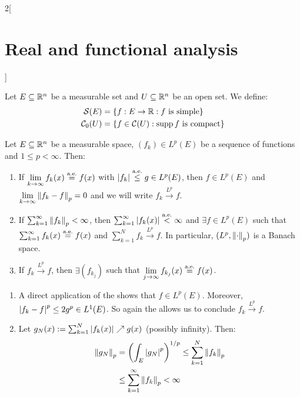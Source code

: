 \documentclass[../../../main_math.tex]{subfiles}
\begin{document}
\begin{multicols}{2}[\section{Real and functional analysis}]
  \begin{definition}
    Let $E\subseteq\mathbb{R}^n$ be a measurable set and $U\subseteq \mathbb{R}^n$ be an open set. We define:
    \begin{align*}
      \mathcal{S}(E)   & =\{f:E\rightarrow\mathbb{R}:f\text{ is simple}\}         \\
      \mathcal{C}_0(U) & =\{f\in\mathcal{C}(U):\operatorname{supp} f\text{ is compact}\}
    \end{align*}
  \end{definition}
  \begin{theorem}
    Let $E\subseteq\mathbb{R}^n$ be a measurable space, $({f}_k)\in L^p(E)$ be a sequence of functions and $1\leq p<\infty$. Then:
    \begin{enumerate}
      \item\label{RFA:thmLpBanachA} If $\displaystyle\lim_{k\to\infty}f_k(x)\overset{\text{a.e.}}{=}{f}(x)$ with $\abs{{f}_k}\overset{\text{a.e.}}{\leq} g\in L^p(E)$, then ${f}\in L^p(E)$ and $\displaystyle\lim_{k\to\infty}\left\|{f}_k-{f}\right\|_p=0$ and we will write ${f}_k\overset{L^p}{\rightarrow}{f}$.
      \item\label{RFA:thmLpBanachB} If $\sum_{k=1}^\infty\left\|{f}_k\right\|_p<\infty$, then $\sum_{k=1}^\infty\abs{f_k(x)}\overset{\text{a.e.}}{<}\infty$ and $\exists f\in L^p(E)$ such that $\sum_{k=1}^\infty f_k(x)\overset{\text{a.e.}}{=}f(x)$ and $\sum_{k=1}^N{f}_k\overset{L^p}{\rightarrow}{f}$. In particular, $(L^p,\left\|\cdot\right\|_p)$ is a Banach space.
      \item\label{RFA:thmLpBanachC} If ${f}_k\overset{L^p}{\rightarrow}{f}$, then $\exists(f_{k_j})$ such that $\displaystyle\lim_{j\to\infty}f_{k_j}(x)\overset{\text{a.e.}}{=}{f}(x)$.
    \end{enumerate}
  \end{theorem}
  \begin{sproof}
    \begin{enumerate}
      \item A direct application of the  shows that $f\in L^p(E)$. Moreover, $\abs{f_k-f}^p\leq{2g}^p\in L^1(E)$. So again the  allows us to conclude ${f}_k\overset{L^p}{\rightarrow}{f}$.
      \item Let $g_N(x):=\sum_{k=1}^N\abs{f_k(x)}\nearrow g(x)$ (possibly infinity). Then:
            \begin{align*}
              \norm{g_N}_p & ={\left(\int_E{\abs{g_N}}^p\right)}^{1/p}\leq \sum_{k=1}^N\norm{{f}_k}_p \\
                           & \leq\sum_{k=1}^\infty\norm{{f}_k}_p<\infty

\end{align*}
\end{enumerate}
\end{sproof}
\end{multicols}
\end{document}
